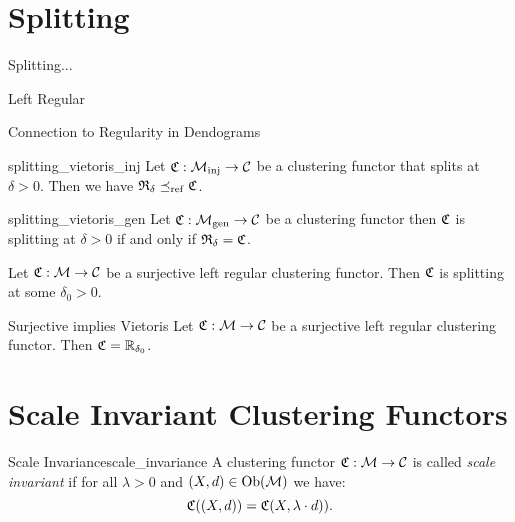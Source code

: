 \section{Splitting}

\begin{definition}
    Splitting...
\end{definition}

\begin{definition}{Left Regular}{}
    \newresult
\end{definition}

\begin{myremark}{Connection to Regularity in Dendograms}{}
\end{myremark}

\begin{proposition}{}{splitting_vietoris_inj}
    Let $\mathfrak{C}: {\mathcal{M}_\mathrm{inj}} \to \mathcal{C}$ be a clustering functor that splits at $\delta > 0$. Then we have $\mathfrak{R}_\delta \preceq_\mathrm{ref} \mathfrak{C}$.
\end{proposition}

\begin{proposition}{}{splitting_vietoris_gen}
    Let $\mathfrak{C}: {\mathcal{M}_\mathrm{gen}} \to \mathcal{C}$ be a clustering functor then $\mathfrak{C}$ is splitting at $\delta > 0$ if and only if $\mathfrak{R}_\delta = \mathfrak{C}$.
\end{proposition}

\begin{corollary}{}{}
    Let $\mathfrak{C}: \mathcal{M} \to \mathcal{C}$ be a surjective left regular clustering functor. Then $\mathfrak{C}$ is splitting at some $\delta_0 > 0$.

    \newresult
\end{corollary}

\begin{corollary}{Surjective implies Vietoris}{}
    Let $\mathfrak{C}: \mathcal{M} \to \mathcal{C}$ be a surjective left regular clustering functor. Then $\mathfrak{C} = \mathbb R_{\delta_0}$.

    \newresult
\end{corollary}

\section{Scale Invariant Clustering Functors}

\begin{definition}{Scale Invariance}{scale_invariance}
    A clustering functor $\mathfrak{C}: \mathcal{M} \to \mathcal{C}$ is called \emph{scale invariant} if for all $\lambda > 0$ and $(X,d) \in \mathrm {Ob}(\mathcal{M})$ we have:
    \begin{equation*}
        \mathfrak{C}((X,d)) = \mathfrak{C}(X,\lambda \cdot d)).
    \end{equation*}
\end{definition}

